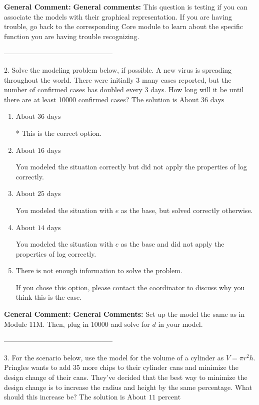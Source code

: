 \documentclass{extbook}[14pt]
\begin{document}
\textbf{General Comment:} \textbf{General comments:} This question is testing if you can associate the models with their graphical representation. If you are having trouble, go back to the corresponding Core module to learn about the specific function you are having trouble recognizing. 

-----------------------------------------------

2. Solve the modeling problem below, if possible.
A new virus is spreading throughout the world. There were initially 3 many cases reported, but the number of confirmed cases has doubled every 3 days. How long will it be until there are at least 10000 confirmed cases? 
The solution is $ \text{About } 36 \text{ days} $ 

\begin{enumerate}[label=\Alph*.] 
\item $ \text{About } 36 \text{ days} $ 

 * This is the correct option. 
\item $ \text{About } 16 \text{ days} $ 

 You modeled the situation correctly but did not apply the properties of log correctly. 
\item $ \text{About } 25 \text{ days} $ 

 You modeled the situation with $e$ as the base, but solved correctly otherwise. 
\item $ \text{About } 14 \text{ days} $ 

 You modeled the situation with $e$ as the base and did not apply the properties of log correctly. 
\item $ \text{There is not enough information to solve the problem.} $ 

 If you chose this option, please contact the coordinator to discuss why you think this is the case. 
\end{enumerate} 
 
\textbf{General Comment:} \textbf{General Comments:} Set up the model the same as in Module 11M. Then, plug in 10000 and solve for $d$ in your model. 

-----------------------------------------------

3. For the scenario below, use the model for the volume of a cylinder as $V = \pi r^2 h$.
Pringles wants to add 35  more chips to their cylinder cans and minimize the design change of their cans. They've decided that the best way to minimize the design change is to increase the radius and height by the same percentage. What should this increase be? 
The solution is $ \text{About } 11 \text{ percent} $ 
\end{document}
